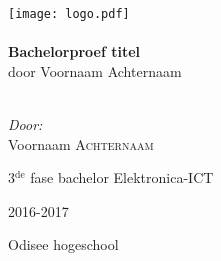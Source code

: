 \begin{titlepage}
\begin{center}
\texttt{[image: logo.pdf]}~\\[1cm]

\HRule \\[0.4cm]
{ \LARGE \bfseries Bachelorproef titel}\\[0.4cm]
{door Voornaam Achternaam}\\[0.2cm]

\HRule \\[1.5cm]

\begin{minipage}{0.4\textwidth}
\begin{flushleft} \large
\emph{Door:}\\
Voornaam \textsc{Achternaam}\\
\end{flushleft}
\end{minipage}

\begin{minipage}{0.4\textwidth}
\begin{flushright} \large
\large{3$^{\text{de}}$ fase bachelor Elektronica-ICT}\\
\end{flushright}
\end{minipage}

\vfill

{\large 2016-2017}

{\large Odisee hogeschool}

\end{center}
\end{titlepage}
